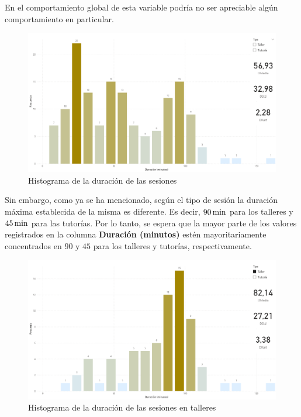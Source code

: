 \documentclass[11pt,a4paper]{book}
\theoremstyle{definition}%
\begin{document}
                En el comportamiento global de esta variable podría no ser apreciable algún comportamiento en particular.
                \begin{figure}[H]
                    \centering
                    \includegraphics[width=1\textwidth]{Sources/histograma_DuracionGlobal.png}
                    \caption{Histograma de la duración de las sesiones}
                \end{figure}
                Sin embargo, como ya se ha mencionado, según el tipo de sesión la duración máxima establecida de la misma es diferente. Es decir, $90\,\textup{min}$ para los talleres y $45\,\textup{min}$ para las tutorías. Por lo tanto, se espera que la mayor parte de los valores registrados en la columna \textbf{Duración (minutos)} estén mayoritariamente concentrados en $90$ y $45$ para los talleres y tutorías, respectivamente.
                \begin{figure}[H]
                    \centering
                    \includegraphics[width=1\textwidth]{Sources/histograma_DuracionTaller.png}
                    \caption{Histograma de la duración de las sesiones en talleres}
                \end{figure}
\end{document}
